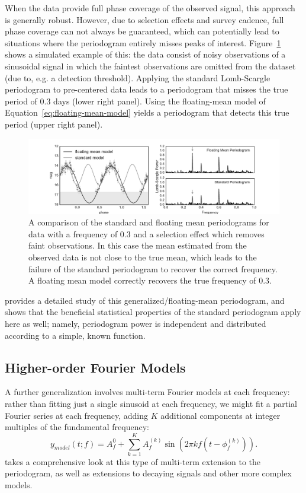 \documentclass[preprint]{aastex}
\newcommand{\Fig}[1]{Figure~\ref{fig:#1}}
\newcommand{\figlabel}[1]{\label{fig:#1}}
\newcommand{\Eq}[1]{Equation~\ref{eq:#1}}
\newcommand{\eq}[1]{\Eq{#1}}
\newcommand{\sectlabel}[1]{\label{sect:#1}}
\begin{document}
When the data provide full phase coverage of the observed signal,
this approach is generally robust.
However, due to selection effects and survey cadence, full phase
coverage can not always be guaranteed, which can potentially lead to situations
where the periodogram entirely misses peaks of interest.
\Fig{standard-vs-floatingmean} shows a simulated example of this: the data
consist of noisy observations of a sinusoidal signal in which the faintest
observations are omitted from the dataset (due to, {e.g.} a detection threshold).
Applying the standard Lomb-Scargle periodogram to pre-centered data leads to a
periodogram that misses the true period of 0.3 days (lower right panel).
Using the floating-mean model of \eq{floating-mean-model} yields a periodogram
that detects this true period (upper right panel).

\begin{figure}[ht]
  \centering
  \includegraphics[width=\textwidth]{fig20_standard_vs_floatingmean}
  \caption{A comparison of the standard and floating mean periodograms for
    data with a frequency of 0.3 and a selection effect which removes
    faint observations.
    In this case the mean estimated from the observed data is not close to
    the true mean, which leads to the failure of the standard periodogram to
    recover the correct frequency. A floating mean model correctly recovers
    the true frequency of 0.3.
    \figlabel{standard-vs-floatingmean}}
\end{figure}

\citet{Zechmeister09} provides a detailed study of this
generalized/floating-mean periodogram, and shows that the beneficial
statistical properties of the standard periodogram apply here as well;
namely, periodogram power is independent and distributed according to a
simple, known function.


\subsection{Higher-order Fourier Models}
\sectlabel{multiterm}

A further generalization involves multi-term Fourier models at each frequency:
rather than fitting just a single sinusoid at each frequency, we might fit a
partial Fourier series at each frequency, adding $K$ additional components at
integer multiples of the fundamental frequency:
\begin{equation}
  y_{model}(t;f) = A_f^{0} + \sum_{k=1}^K A_f^{(k)} \sin(2\pi k f (t - \phi_f^{(k)})).
\end{equation}
\citet{Bretthorst88} takes a comprehensive look at this type of multi-term
extension to the periodogram, as well as extensions to decaying signals and
other more complex models.
\end{document}
